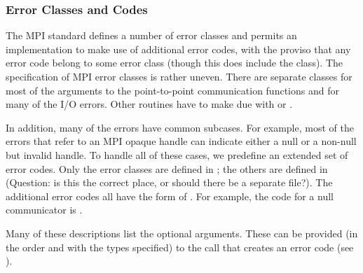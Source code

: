 %
\subsubsection{Error Classes and Codes}
The MPI standard defines a number of error classes and permits an
implementation to make use of additional error codes, with the proviso that
any error code belong to some error class (though this does include the
 class).  
The specification of MPI error classes is rather uneven.  There are separate
classes for most of the arguments to the point-to-point communication
functions and for many of the I/O errors.  Other routines have to make due
with  or .

In addition, many of the errors have common subcases.  For example, most of
the errors that refer to an MPI opaque handle can indicate either a null or a
non-null but invalid handle.   To handle all of these cases, we predefine an
extended set of error codes.  Only the error classes are defined in
; the others are defined in  (Question: is this
the correct place, or should there be a separate file?).  The additional error
codes all have the form of .  For example,
the code for a null communicator is .

Many of these descriptions list the optional arguments.  These can be provided
(in the order and with the types specified) to the call that creates an error
code (see ). 

